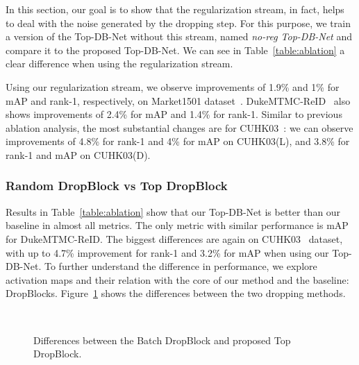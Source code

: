 \documentclass[a4paper,conference]{IEEEtran}
\begin{document}
In this section, our goal is to show that the regularization stream, in fact, helps to deal with the noise generated by the dropping step. For this purpose, we train a version of the Top-DB-Net without this stream, named \textit{no-reg Top-DB-Net} and compare it to the proposed Top-DB-Net. We can see in Table~\ref{table:ablation} a clear difference when using the regularization stream.
 
Using our regularization stream, we observe improvements of 1.9\% and 1\% for mAP and rank-1, respectively, on Market1501 dataset~\cite{zheng2015scalable}. DukeMTMC-ReID~\cite{zheng2017unlabeled,ristani2016MTMC} also shows improvements of 2.4\% for mAP and 1.4\% for rank-1. Similar to previous ablation analysis, the most substantial changes are for CUHK03~\cite{li2014deepReID,zhong2017re}: we can observe improvements of 4.8\% for rank-1 and 4\% for mAP on CUHK03(L), and 3.8\% for rank-1 and mAP on CUHK03(D).
 
\subsubsection{\textbf{Random DropBlock vs Top DropBlock}}
 
Results in Table~\ref{table:ablation} show that our Top-DB-Net is better than our baseline in almost all metrics. The only metric with similar performance is mAP for DukeMTMC-ReID. The biggest differences are again on CUHK03~\cite{li2014deepReID,zhong2017re} dataset, with up to 4.7\% improvement for rank-1 and 3.2\% for mAP when using our Top-DB-Net. To further understand the difference in performance, we explore activation maps and their relation with the core of our method and the baseline: DropBlocks. Figure~\ref{fig:DropBlock_vs_topDropBlock} shows the differences between the two dropping methods.
 
\begin{figure}[!htb]
  \centering
   \\
  \caption{Differences between the Batch DropBlock and proposed Top DropBlock.}
  \label{fig:DropBlock_vs_topDropBlock}
\end{figure}
 
\end{document}
